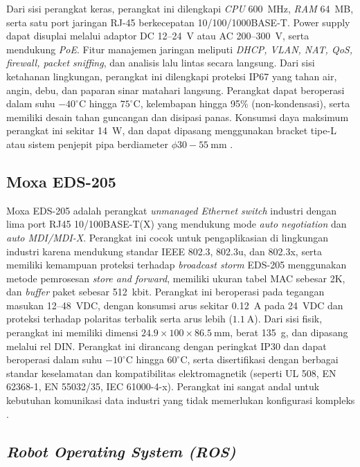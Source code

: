 Dari sisi perangkat keras, perangkat ini dilengkapi \emph{CPU} 600~MHz, \emph{RAM} 64~MB, serta satu port jaringan RJ-45 berkecepatan 10/100/1000BASE-T. Power supply dapat disuplai melalui adaptor DC 12--24~V atau AC 200--300~V, serta mendukung \emph{PoE}. Fitur manajemen jaringan meliputi \emph{DHCP, VLAN, NAT, QoS, firewall, packet sniffing}, dan analisis lalu lintas secara langsung. Dari sisi ketahanan lingkungan, perangkat ini dilengkapi proteksi IP67 yang tahan air, angin, debu, dan paparan sinar matahari langsung. Perangkat dapat beroperasi dalam suhu \(-40^\circ\text{C}\) hingga \(75^\circ\text{C}\), kelembapan hingga 95\% (non-kondensasi), serta memiliki desain tahan guncangan dan disipasi panas. Konsumsi daya maksimum perangkat ini sekitar 14~W, dan dapat dipasang menggunakan bracket tipe-L atau sistem penjepit pipa berdiameter \(\phi 30{-}55~\text{mm}\) \cite{doublecom_db6000anlt90}.

\subsection{Moxa EDS-205}

Moxa EDS-205 adalah perangkat \emph{unmanaged Ethernet switch} industri dengan lima port RJ45 10/100BASE-T(X) yang mendukung mode \emph{auto negotiation} dan \emph{auto MDI/MDI-X}. Perangkat ini cocok untuk pengaplikasian di lingkungan industri karena mendukung standar IEEE 802.3, 802.3u, dan 802.3x, serta memiliki kemampuan proteksi terhadap \emph{broadcast storm} EDS-205 menggunakan metode pemrosesan \emph{store and forward}, memiliki ukuran tabel MAC sebesar 2K, dan \emph{buffer} paket sebesar 512~kbit. Perangkat ini beroperasi pada tegangan masukan 12--48~VDC, dengan konsumsi arus sekitar 0.12~A pada 24~VDC dan proteksi terhadap polaritas terbalik serta arus lebih (\(1.1~\text{A}\)). Dari sisi fisik, perangkat ini memiliki dimensi \(24.9 \times 100 \times 86.5~\text{mm}\), berat 135~g, dan dipasang melalui rel DIN. Perangkat ini dirancang dengan peringkat IP30 dan dapat beroperasi dalam suhu \(-10^\circ\text{C}\) hingga \(60^\circ\text{C}\), serta disertifikasi dengan berbagai standar keselamatan dan kompatibilitas elektromagnetik (seperti UL 508, EN 62368-1, EN 55032/35, IEC 61000-4-x). Perangkat ini sangat andal untuk kebutuhan komunikasi data industri yang tidak memerlukan konfigurasi kompleks \cite{moxa_eds205}.

\subsection{\emph{Robot Operating System (ROS)}}


